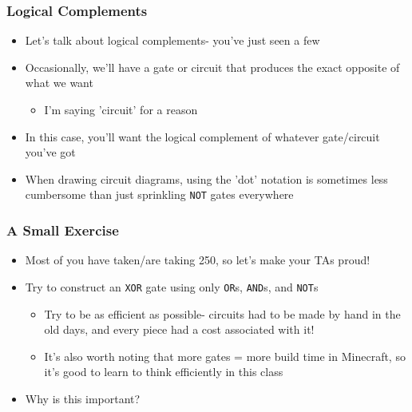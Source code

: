 \documentclass{beamer}
\begin{document}
             \begin{frame}
                \frametitle{Logical Complements}
                \begin{itemize}
                    \item Let's talk about logical complements- you've just seen a few
                    \item Occasionally, we'll have a gate or circuit that produces the exact opposite of what we want
                        \begin{itemize}
                            \item I'm saying 'circuit' for a reason
                        \end{itemize}
                    \item In this case, you'll want the logical complement of whatever gate/circuit you've got
                    \item When drawing circuit diagrams, using the 'dot' notation is sometimes less cumbersome than just sprinkling \texttt{NOT} gates everywhere
                \end{itemize}
               
            \end{frame}
            
            \begin{frame}
                \frametitle{A Small Exercise}
                \begin{itemize}
                    \item Most of you have taken/are taking 250, so let's make your TAs proud!
                    \item Try to construct an \texttt{XOR} gate using only \texttt{OR}s, \texttt{AND}s, and \texttt{NOT}s
                        \begin{itemize}
                            \item Try to be as efficient as possible- circuits had to be made by hand in the old days, and every piece had a cost associated with it!
                            \item It's also worth noting that more gates = more build time in Minecraft, so it's good to learn to think efficiently in this class
                        \end{itemize}
                    \item Why is this important?
                \end{itemize}
               
            \end{frame}
            
\end{document}
